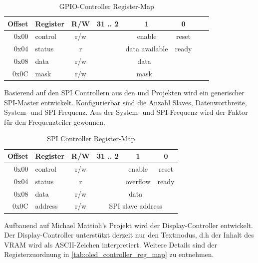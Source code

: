 \begin{table}[!htbp]
	\bigskip
	\centering
	\begin{tabular}{ | r | l | c | c | c | c | c | c |}
		\hline
		\textbf{Offset} & \textbf{Register} & \textbf{R/W} & \textbf{31 .. 2} & \textbf{1} & \textbf{0} \\
		\hline
		0x00 & control & r/w & & enable & reset \\
		\hline
		0x04 & status & r & & data available & ready \\
		\hline
		0x08 & data & r/w & \multicolumn{3}{c|}{data} \\
		\hline
		0x0C & mask & r/w & \multicolumn{3}{c|}{mask} \\
		\hline
	\end{tabular}
	
	\caption{GPIO-Controller Register-Map}
	\label{tab:gpio_reg_map}
\end{table}

Basierend auf den SPI Controllern aus den  \cite{website:zedboard_oled} und  \cite{website:digilent_nexys_video} Projekten wird ein generischer SPI-Master entwickelt. Konfigurierbar sind die Anzahl Slaves, Datenwortbreite, System- und SPI-Frequenz. Aus der System- und SPI-Frequenz wird der Faktor für den Frequenzteiler gewonnen.

\begin{table}[!htbp]
	\bigskip
	\centering
	\begin{tabular}{ | r | l | c | c | c | c |}
		\hline
		\textbf{Offset} & \textbf{Register} & \textbf{R/W} & \textbf{31 .. 2} & \textbf{1} & \textbf{0} \\
		\hline
		0x00 & control & r/w & & enable & reset \\
		\hline
		0x04 & status & r & & overflow & ready \\
		\hline
		0x08 & data & r/w & \multicolumn{3}{c|}{data} \\
		\hline
		0x0C & address & r/w & \multicolumn{3}{c|}{SPI slave address} \\
		\hline
	\end{tabular}
	
	\caption{SPI Controller Register-Map}
	\label{tab:spic_reg_map}
\end{table}

Aufbauend auf Michael Mattioli's Projekt  \cite{website:zedboard_oled} wird der Display-Controller entwickelt. Der Display-Controller unterstützt derzeit nur den Textmodus, d.h der Inhalt des VRAM wird als ASCII-Zeichen interpretiert. Weitere Details sind der Registerzuordnung in \cref{tab:oled_controller_reg_map} zu entnehmen.

